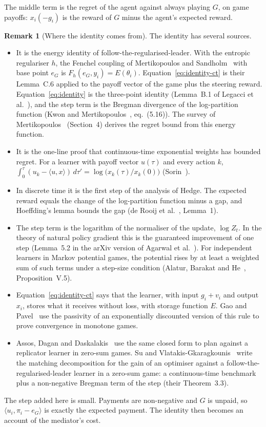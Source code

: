 \documentclass[11pt,a4paper]{article}
\theoremstyle{definition}
\newtheorem{remark}{Remark}
\theoremstyle{plain}
\begin{document}
The middle term is the regret of the agent against always playing $G$, on game payoffs: $x_i(-g_i)$ is the reward of $G$ minus the agent's expected reward.

\begin{remark}[Where the identity comes from]\label{rem:origin}
The identity has several sources.
\begin{itemize}
\item It is the energy identity of follow-the-regularised-leader. With the entropic regulariser $h$, the Fenchel coupling of Mertikopoulos and Sandholm~\cite{mertikopoulos2016} with base point $e_G$ is $F_h(e_G,y_i)=E(\theta_i)$. Equation~\eqref{eq:identity-ct} is their Lemma~C.6 applied to the payoff vector of the game plus the steering reward. Equation~\eqref{eq:identity} is the three-point identity (Lemma~B.1 of Legacci et al.~\cite{legacci2024b}), and the step term is the Bregman divergence of the log-partition function (Kwon and Mertikopoulos~\cite{kwon2017}, eq.~(5.16)). The survey of Mertikopoulos~\cite{mertikopoulos2026} (Section~4) derives the regret bound from this energy function.
\item It is the one-line proof that continuous-time exponential weights has bounded regret. For a learner with payoff vector $u(\tau)$ and every action $k$, $\int_0^{\tau}(u_k-\langle u,x\rangle)\,d\tau'=\log\bigl(x_k(\tau)/x_k(0)\bigr)$ (Sorin~\cite{sorin2020}).
\item In discrete time it is the first step of the analysis of Hedge. The expected reward equals the change of the log-partition function minus a gap, and Hoeffding's lemma bounds the gap (de Rooij et al.~\cite{derooij2014}, Lemma~1).
\item The step term is the logarithm of the normaliser of the update, $\log Z_t$. In the theory of natural policy gradient this is the guaranteed improvement of one step (Lemma~5.2 in the arXiv version of Agarwal et al.~\cite{agarwal2021}). For independent learners in Markov potential games, the potential rises by at least a weighted sum of such terms under a step-size condition (Alatur, Barakat and He~\cite{alatur2024}, Proposition~V.5).
\item Equation~\eqref{eq:identity-ct} says that the learner, with input $g_i+v_i$ and output $x_i$, stores what it receives without loss, with storage function $E$. Gao and Pavel~\cite{gao2018} use the passivity of an exponentially discounted version of this rule to prove convergence in monotone games.
\item Assos, Dagan and Daskalakis~\cite{assos2024} use the same closed form to plan against a replicator learner in zero-sum games. Su and Vlatakis-Gkaragkounis~\cite{su2026} write the matching decomposition for the gain of an optimiser against a follow-the-regularised-leader learner in a zero-sum game: a continuous-time benchmark plus a non-negative Bregman term of the step (their Theorem~3.3).
\end{itemize}
The step added here is small. Payments are non-negative and $G$ is unpaid, so $\langle u_i,\pi_i-e_G\rangle$ is exactly the expected payment. The identity then becomes an account of the mediator's cost.
\end{remark}
\end{document}
